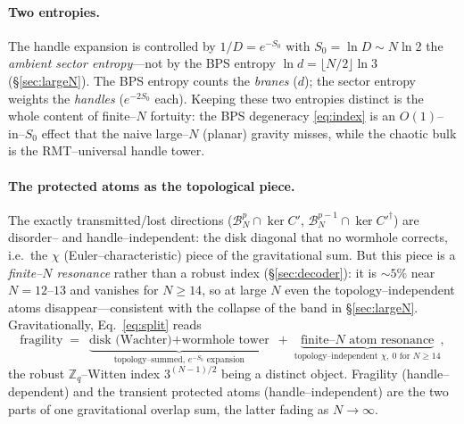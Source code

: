 \documentclass[11pt]{article}
\newcommand{\dg}{^{\dagger}}
\begin{document}
\paragraph{Two entropies.}
The handle expansion is controlled by $1/D=e^{-S_0}$ with $S_0=\ln D\sim N\ln2$ the \emph{ambient
sector entropy}---not by the BPS entropy $\ln d=\lfloor N/2\rfloor\ln3$ (\S\ref{sec:largeN}). The BPS
entropy counts the \emph{branes} ($d$); the sector entropy weights the \emph{handles} ($e^{-2S_0}$
each). Keeping these two entropies distinct is the whole content of finite--$N$ fortuity: the BPS
degeneracy \eqref{eq:index} is an $O(1)$--in--$S_0$ effect that the naive large--$N$ (planar) gravity
misses, while the chaotic bulk is the RMT--universal handle tower.

\paragraph{The protected atoms as the topological piece.}
The exactly transmitted/lost directions ($\mathcal B_N^p\cap\ker C'$, $\mathcal B_N^{p-1}\cap\ker{C'}\dg$)
are disorder-- and handle--independent: the disk diagonal that no wormhole corrects, i.e.\ the $\chi$
(Euler--characteristic) piece of the gravitational sum. But this piece is a \emph{finite--$N$ resonance}
rather than a robust index (\S\ref{sec:decoder}): it is $\sim5\%$ near $N=12$--$13$ and vanishes for
$N\ge14$, so at large $N$ even the topology--independent atoms disappear---consistent with the collapse
of the band in \S\ref{sec:largeN}. Gravitationally, Eq.~\eqref{eq:split} reads
\begin{equation}
  \text{fragility} \;=\; \underbrace{\text{disk (Wachter)} + \text{wormhole tower}}_{\text{topology--summed, } e^{-S_0}\text{ expansion}}
  \;+\;\underbrace{\text{finite--}N\text{ atom resonance}}_{\text{topology--independent }\chi,\ 0\text{ for }N\ge14} ,
\end{equation}
the robust $\mathbb Z_q$--Witten index $3^{(N-1)/2}$ being a distinct object. Fragility
(handle--dependent) and the transient protected atoms (handle--independent) are the two parts of one
gravitational overlap sum, the latter fading as $N\to\infty$.
\end{document}
